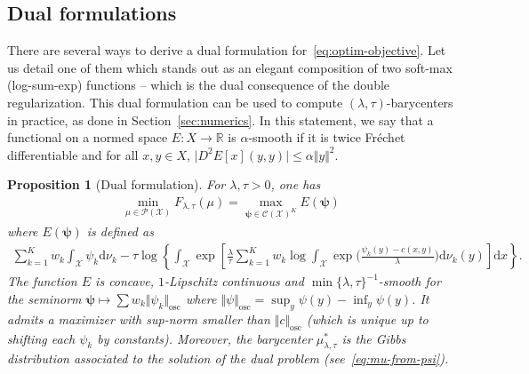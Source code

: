 \documentclass[11pt]{article}
\newcommand{\rev}[1]{{#1}}
\newcommand{\Cc}{\mathcal{C}}
\newcommand{\Pp}{\mathcal{P}}
\newcommand{\Xx}{\mathcal{X}}
\renewcommand{\d}{\mathrm{d}}
\newtheorem{proposition}[theorem]{Proposition}
\begin{document}
\subsection{Dual formulations}\label{sec:dual-formulations}
There are several ways to derive a dual formulation for~\eqref{eq:optim-objective}. Let us detail one of them which stands out as an elegant composition of two soft-max (log-sum-exp) functions -- which is the dual consequence of the double regularization. This dual formulation can be used to compute $(\lambda,\tau)$-barycenters in practice, as done in Section~\ref{sec:numerics}. \rev{In this statement, we say that a functional on a normed space $E:X\to \mathbb{R}$ is $\alpha$-smooth if it is twice Fréchet differentiable and for all $x,y\in X$, $\vert D^2 E[x](y,y)\vert \leq \alpha \Vert y\Vert^2$.}
\newcommand{\bphi}{{\boldsymbol{\phi}}}
\newcommand{\bpsi}{{\boldsymbol{\psi}}}
\begin{proposition}[Dual formulation]\label{prop:dual}
For $\lambda,\tau>0$, one has
\begin{align}\label{eq:primal-dual}
\min_{\mu \in \Pp(\Xx)} F_{\lambda,\tau}(\mu)=\max_{\bpsi \in \Cc(\Xx)^K} E(\bpsi)
\end{align}
where $E(\bpsi) $ is defined as
\begin{align}\label{eq:dual}
\sum_{k=1}^K w_k \int_\Xx \psi_{k}\d\nu_k -\tau \log \left\{
\int_\Xx \exp 
\left[
\frac{\lambda}{\tau} \sum_{k=1}^Kw_k \log\int_\Xx \exp\Big( \frac{\psi_k(y)-c(x,y)}{\lambda}\Big)\d\nu_k(y) 
\right]\d x
\right\}.
\end{align}
The function $E$ is concave, $1$-Lipschitz continuous and $\min\{\lambda,\tau\}^{-1}$-smooth for the seminorm $\bpsi \mapsto \sum w_k \Vert \psi_k\Vert_\mathrm{osc}$ where $\Vert \psi\Vert_\mathrm{osc} = \sup_y \psi(y)-\inf_y \psi(y)$. It admits a maximizer with sup-norm smaller than $\Vert c\Vert_{\mathrm{osc}}$ (which is unique up to shifting each $\psi_k$ by constants). 
Moreover, the barycenter $\mu^*_{\lambda,\tau}$ is the Gibbs distribution associated to the solution of the dual problem (see~\eqref{eq:mu-from-psi}). 
\end{proposition}
\end{document}
